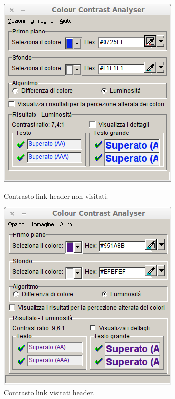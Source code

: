 \documentclass[a4paper]{article}
\begin{document}
\begin{figure}[htbp]
\begin{minipage}[b]{0.47\textwidth}
\centering
\includegraphics[width=\textwidth]{test/contrasto/Test_Header_Link.png}
\caption{\label{f_etichetta}Contrasto link header non visitati.}
\end{minipage}
\hfill
\begin{minipage}[b]{0.47\textwidth}
\includegraphics[width=\textwidth]{test/contrasto/Test_Header_Link_Visited.png}
\caption{\label{f_etichetta}Contrasto link visitati header.}
\end{minipage}
\end{figure}
\end{document}
